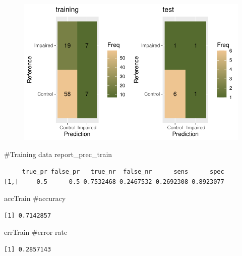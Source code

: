 \documentclass[
  letterpaper,
  DIV=11,
  numbers=noendperiod]{scrartcl}
\newenvironment{Shaded}{\begin{snugshade}}{\end{snugshade}}
\newcommand{\CommentTok}[1]{\textcolor[rgb]{0.37,0.37,0.37}{#1}}
\newcommand{\NormalTok}[1]{\textcolor[rgb]{0.00,0.23,0.31}{#1}}
\begin{document}
\begin{figure}[H]

{\centering \includegraphics{excercise_doc_files/figure-pdf/unnamed-chunk-13-1.pdf}

}

\end{figure}

\begin{Shaded}
\begin{Highlighting}[]
\CommentTok{\#Training data}
\NormalTok{report\_prec\_train}
\end{Highlighting}
\end{Shaded}

\begin{verbatim}
     true_pr false_pr   true_nr  false_nr      sens      spec
[1,]     0.5      0.5 0.7532468 0.2467532 0.2692308 0.8923077
\end{verbatim}

\begin{Shaded}
\begin{Highlighting}[]
\NormalTok{accTrain }\CommentTok{\#accuracy}
\end{Highlighting}
\end{Shaded}

\begin{verbatim}
[1] 0.7142857
\end{verbatim}

\begin{Shaded}
\begin{Highlighting}[]
\NormalTok{errTrain }\CommentTok{\#error rate}
\end{Highlighting}
\end{Shaded}

\begin{verbatim}
[1] 0.2857143
\end{verbatim}
\end{document}
